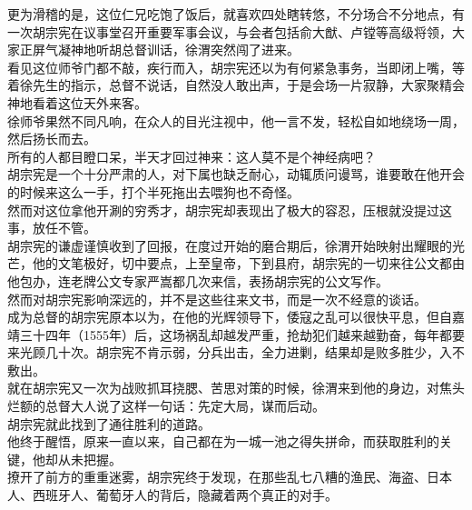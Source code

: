 \begin{multicols}{\theparacolNo}
更为滑稽的是，这位仁兄吃饱了饭后，就喜欢四处瞎转悠，不分场合不分地点，有一次胡宗宪在议事堂召开重要军事会议，与会者包括俞大猷、卢镗等高级将领，大家正屏气凝神地听胡总督训话，徐渭突然闯了进来。\\

看见这位师爷门都不敲，疾行而入，胡宗宪还以为有何紧急事务，当即闭上嘴，等着徐先生的指示，总督不说话，自然没人敢出声，于是会场一片寂静，大家聚精会神地看着这位天外来客。\\

徐师爷果然不同凡响，在众人的目光注视中，他一言不发，轻松自如地绕场一周，然后扬长而去。\\

所有的人都目瞪口呆，半天才回过神来：这人莫不是个神经病吧？\\

胡宗宪是一个十分严肃的人，对下属也缺乏耐心，动辄质问谩骂，谁要敢在他开会的时候来这么一手，打个半死拖出去喂狗也不奇怪。\\

然而对这位拿他开涮的穷秀才，胡宗宪却表现出了极大的容忍，压根就没提过这事，放任不管。\\

胡宗宪的谦虚谨慎收到了回报，在度过开始的磨合期后，徐渭开始映射出耀眼的光芒，他的文笔极好，切中要点，上至皇帝，下到县府，胡宗宪的一切来往公文都由他包办，连老牌公文专家严嵩都几次来信，表扬胡宗宪的公文写作。\\

然而对胡宗宪影响深远的，并不是这些往来文书，而是一次不经意的谈话。\\

成为总督的胡宗宪原本以为，在他的光辉领导下，倭寇之乱可以很快平息，但自嘉靖三十四年（1555年）后，这场祸乱却越发严重，抢劫犯们越来越勤奋，每年都要来光顾几十次。胡宗宪不肯示弱，分兵出击，全力进剿，结果却是败多胜少，入不敷出。\\

就在胡宗宪又一次为战败抓耳挠腮、苦思对策的时候，徐渭来到他的身边，对焦头烂额的总督大人说了这样一句话：先定大局，谋而后动。\\

胡宗宪就此找到了通往胜利的道路。\\

他终于醒悟，原来一直以来，自己都在为一城一池之得失拼命，而获取胜利的关键，他却从未把握。\\

撩开了前方的重重迷雾，胡宗宪终于发现，在那些乱七八糟的渔民、海盗、日本人、西班牙人、葡萄牙人的背后，隐藏着两个真正的对手。\\
\ifnum{}
	\end{multicols}
\fi
\newpage
